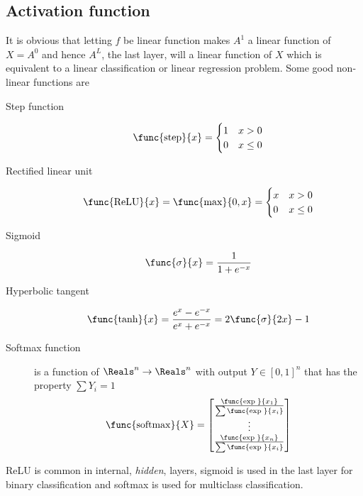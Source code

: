 \subsection{Activation function}
It is obvious that letting \(f\) be linear function makes \(A^1\) a linear function of \(X = A^0\) and hence \(A^L\), the last layer, will a linear function of \(X\) which is equivalent to a linear classification or linear regression problem. Some good non-linear functions are 
\begin{description}
    \item[Step function] 
    \begin{equation*}
        \func{\mathrm{step}}{x} = \begin{cases}
            1 & x > 0 \\
            0 & x \leq 0
        \end{cases}
    \end{equation*} 
    \item[Rectified linear unit]
    \begin{equation*}
        \func{\mathrm{ReLU}}{x} = \func{\max}{0 ,x} = \begin{cases}
            x & x > 0 \\
            0 & x \leq 0
        \end{cases} 
    \end{equation*} 
    \item[Sigmoid]
    \begin{equation*}
        \func{\sigma}{x} = \dfrac{1}{1 + e^{-x}}
    \end{equation*} 
    \item[Hyperbolic tangent]
    \begin{equation*}
        \func{\tanh}{x} = \dfrac{e^x - e^{-x}}{e^x + e^{-x}} = 2 \func{\sigma}{2x}  -1
    \end{equation*} 
    \item[Softmax function]  is a function of \(\Reals^n \to \Reals^n\) with output \(Y \in [0,1]^n\)  that has the property \(\sum Y_i = 1\) 
    \begin{equation*}
        \func{\mathrm{softmax}}{X} = \begin{bmatrix}
            \frac{\func{\exp \;}{x_1}}{\sum \func{\exp \;}{x_i}} \\
            \vdots \\
            \frac{\func{\exp \;}{x_n}}{\sum \func{\exp \;}{x_i}}
        \end{bmatrix}
    \end{equation*} 
\end{description}
ReLU is common in internal, \textit{hidden}, layers, sigmoid is used in the last layer for binary classification and softmax is used for multiclass classification.
